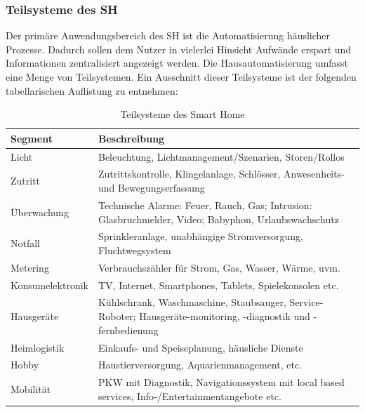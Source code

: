     \subsubsection*{Teilsysteme des \acl{SH}}
    \label{subsubsec:teilsystemeSH}
        Der primäre Anwendungsbereich des \acl{SH} ist die Automatisierung häuslicher Prozesse. Dadurch sollen dem Nutzer 
        in vielerlei Hinsicht Aufwände erspart und Informationen zentralisiert angezeigt werden. Die Hausautomatisierung 
        umfasst eine Menge von Teilsystemen. Ein Ausschnitt dieser Teilsysteme ist der folgenden tabellarischen Auflistung zu entnehmen: 
        \begin{table}[hbt!]
            \begin{center}
                \begin{tabular}{| p{3cm} | p{12.75cm} | }
                    \hline
                        \textbf{Segment} & \textbf{Beschreibung} \\
                    \hline
                        Licht & Beleuchtung, Lichtmanagement/Szenarien, Storen/Rollos \\ 
                    \hline
                        Zutritt & Zutrittskontrolle, Klingelanlage, Schlösser, Anwesenheits- und Bewegungserfassung \\ 
                    \hline
                        Überwachung & Technische Alarme: Feuer, Rauch, Gas; Intrusion: Glasbruchmelder, Video; Babyphon, Urlaubswachschutz \\ 
                    \hline
                        Notfall & Sprinkleranlage, unabhängige Stromversorgung, Fluchtwegsystem \\ 
                    \hline
                        Metering & Verbrauchszähler für Strom, Gas, Wasser, Wärme, uvm. \\ 
                    \hline 
                        Konsumelektronik & TV, Internet, Smartphones, Tablets, Spielekonsolen etc. \\
                    \hline
                        Hausgeräte & Kühlschrank, Waschmaschine, Staubsauger, Service-Roboter; Hausgeräte-monitoring, -diagnostik und -fernbedienung \\
                    \hline
                        Heimlogistik & Einkaufs- und Speiseplanung, häusliche Dienste \\ 
                    \hline
                        Hobby & Haustierversorgung, Aquarienmanagement, etc. \\
                    \hline
                        Mobilität & PKW mit Diagnostik, Navigationssystem mit local based services, Info-/Entertainmentangebote etc. \\ 
                    \hline
                \end{tabular}
            \end{center}
            \caption{Teilsysteme des Smart Home \cite{strese.2010m}}
            \label{tab:teilsysteme}
        \end{table}
